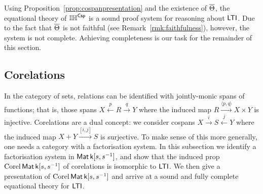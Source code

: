 Using Proposition~\ref{prop:cospanpresentation} and the existence of $\overline{\Theta}$,
the equational theory of $\mathbb{IH}^{\mathsf{Csp}}$ is a sound proof system for reasoning about
$\operatorname{\mathsf{LTI}}$. Due to the fact that $\overline{\Theta}$ is not faithful (see
Remark~\ref{rmk:faithfulness}), however, the system is not complete. Achieving
completeness is our task for the remainder of this section.


\subsection{Corelations}



In the category of sets, relations can be identified with jointly-monic spans of
functions; that is, those spans $X\xleftarrow{p}R\xrightarrow{q}Y$ where the
induced map $R\xrightarrow{\langle p,q\rangle}X\times Y$ is injective.
Corelations are a dual concept: we consider cospans
$X\xrightarrow{i}S\xleftarrow{j}Y$ where the induced map
$X+Y\xrightarrow{[i,j]}S$ is surjective. To make sense of this more generally,
one needs a category with a factorisation system. 
In this subsection we
identify a factorisation system in $\operatorname{\mathsf{Mat}}{\mathsf{k}[s,s^{-1}]}$, and show that the induced prop
$\operatorname{{Corel}}\operatorname{\mathsf{Mat}}{\mathsf{k}[s,s^{-1}]}$ of corelations is isomorphic to $\operatorname{\mathsf{LTI}}$.  We then give a
presentation of $\operatorname{{Corel}}\operatorname{\mathsf{Mat}}{\mathsf{k}[s,s^{-1}]}$ and arrive at a sound and fully complete
equational theory for $\operatorname{\mathsf{LTI}}$.


